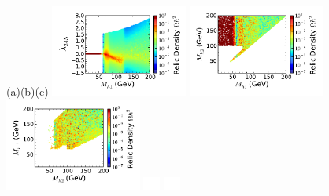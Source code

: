 \begin{figure}[htb]
\vskip 0.2cm
\hspace*{1.4cm}(a)\hspace*{0.35\textwidth}\hspace*{-1.4cm}(b)\hspace*{0.35\textwidth}\hspace*{-1.5cm}(c)
\vskip  0.0cm
%
{\hspace*{-0.3cm}\includegraphics[width=0.4\textwidth]{Figures/Mh1_ld345_Omega_small-cut123456_z.pdf}}%
{\hspace*{-1.55cm}\includegraphics[width=0.4\textwidth]{Figures/Mh1_Mh2_Omega_small-cut123456_z.pdf}}%
{\hspace*{-1.55cm}\includegraphics[width=0.4\textwidth]{Figures/Mhc_Mh2_Omega_small-cut123456_z.pdf}}%
\vskip -5.2cm
\hspace*{4.9cm}\includegraphics[width=0.55cm,height=4.cm]{Figures/blank.pdf}%
\hspace*{4.9cm}\includegraphics[width=0.55cm,height=4.cm]{Figures/blank.pdf}%

\end{figure}
